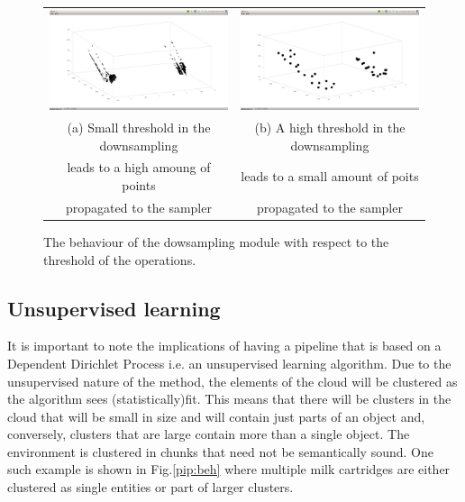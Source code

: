 \documentclass[twoside,hidelinks]{article}
\begin{document}
\begin{figure}[!ht]
\begin{tabular}{cc}
    \includegraphics[width=.4\textwidth]{smalldownsamplinglimit} &  \includegraphics[width=.4\textwidth]{largedownsamplinglimit} \\
    (a) Small threshold in the downsampling  & (b) A high threshold in the downsampling  \\
        leads to  a high amoung of points    &     leads to a small amount of poits \\
        propagated to the sampler            &     propagated to the sampler  \\[6pt]
\end{tabular}
\caption{The behaviour of the dowsampling module with respect to the threshold of the operations.}
  \label{pip:downsample}
\end{figure}
  
\subsection{Unsupervised learning}


It is important to note the implications of having a pipeline that is based on a Dependent Dirichlet Process i.e. an unsupervised learning algorithm. Due to the unsupervised nature of the method, the elements of the cloud will be clustered as the algorithm sees (statistically)fit. This means that there will be clusters in the cloud that will be small in size and will contain just parts of an object and, conversely, clusters that are large contain more than a single object. The environment is clustered in chunks that need not be semantically sound. One such example is shown in Fig.\ref{pip:beh} where multiple milk cartridges are either clustered as single entities or part of larger clusters.
\end{document}
